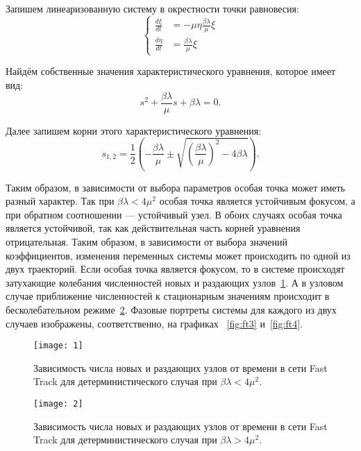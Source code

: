 \documentclass[floatfix,
showkeys,
twocolumn, nofootinbib, superscriptaddress, ]{revtex4-1}
\begin{document}
  Запишем линеаризованную систему в окрестности точки равновесия:
\begin{equation}
  \label{ft:8} 
  \left\{
    \begin{aligned}
      \frac{d\xi }{d t}&= - \mu \eta \frac{\beta \lambda }{\mu}\xi  \\
      \frac{d\eta }{d t}&= \frac{\beta \lambda }{\mu}\xi
    \end{aligned}
  \right.
\end{equation}

  Найдём собственные значения характеристического уравнения, которое
  имеет вид:
\begin{equation}
  \label{ft:9} 
  s^2+\frac{\beta \lambda }{\mu} s + \beta
  \lambda =0.
\end{equation}


  Далее запишем корни этого характеристического уравнения:
\begin{equation}
  \label{ft:10} 
  s_{1,2}= \frac{1}{2} \left(
    -\frac{\beta \lambda }{\mu} \pm \sqrt{ \left( \frac{\beta \lambda
        }{\mu} \right)^2 - 4 \beta \lambda} \right).
\end{equation}

  Таким образом, в зависимости от выбора параметров особая точка может
  иметь разный характер. Так при $\beta \lambda < 4\mu^2$ особая точка
  является устойчивым фокусом, а при обратном соотношении ---
  устойчивый узел. В обоих случаях особая точка является устойчивой,
  так как действительная часть корней уравнения отрицательная. Таким
  образом, в зависимости от выбора значений коэффициентов, изменения
  переменных системы может происходить по одной из двух
  траекторий. Если особая точка является фокусом, то в системе
  происходят затухающие колебания численностей новых и раздающих
  узлов~\ref{fig:ft1}. А в узловом случае приближение численностей к
  стационарным значениям происходит в бесколебательном
  режиме~\ref{fig:ft2}. Фазовые портреты системы для каждого из двух
  случаев изображены, соответственно, на графиках ~\ref{fig:ft3}
  и~\ref{fig:ft4}.

\begin{figure}\centering
  \texttt{[image: 1]}
    \caption{Зависимость числа новых и раздающих узлов от времени в
      сети Fast Track для детерминистического случая при 
      $\beta \lambda < 4\mu^2$.}
  \label{fig:ft1}
\end{figure}

\begin{figure}\centering
  \texttt{[image: 2]}
    \caption{Зависимость числа новых и раздающих узлов от времени в
      сети Fast Track для детерминистического случая при $\beta
      \lambda > 4\mu^2$.}
  \label{fig:ft2}
\end{figure}
\end{document}
